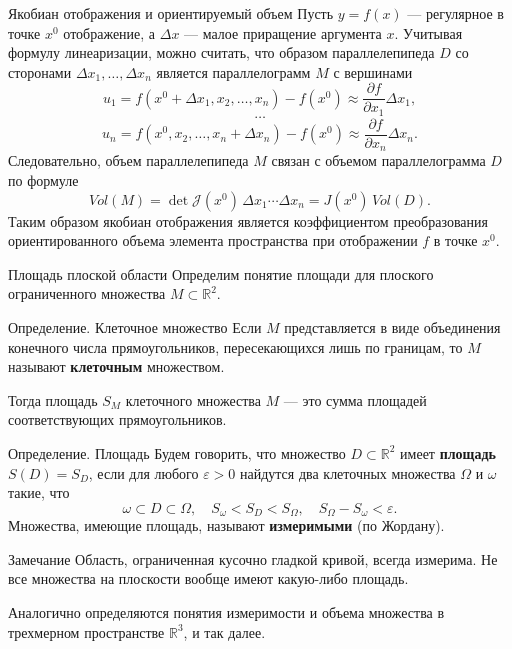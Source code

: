 \documentclass[8pt]{beamer}
\newcommand{\pp}[2]{\frac{\partial #1}{\partial #2}}
\begin{document}
\begin{frame}{Якобиан отображения и ориентируемый объем}
Пусть $y = f(x)$ --- регулярное в точке $x^0$ отображение, а $\Delta x$ --- малое приращение аргумента $x$. Учитывая формулу линеаризации, можно считать, что образом параллелепипеда $D$ со сторонами $\Delta x_1,\ldots,\Delta x_n$ является параллелограмм $M$ с вершинами 
$$u_1=f(x^0+\Delta x_1,x_2,\ldots,x_n)-f(x^0) \approx \pp{f}{x_1}\Delta x_1,$$
$$\ldots$$
$$ u_n = f(x^0,x_2,\ldots,x_n+\Delta x_n)-f(x^0) \approx \pp{f}{x_n}\Delta x_n.$$
Следовательно, объем параллелепипеда $M$ связан с объемом параллелограмма $D$ по формуле
$$Vol(M) = \det\mathcal{J}(x^0)\, \Delta x_1\cdots\Delta x_n = J(x^0)\, Vol(D).$$
Таким образом якобиан отображения является коэффициентом преобразования ориентированного объема элемента пространства при отображении $f$ в точке $x^0$.
\end{frame}

\begin{frame}{Площадь плоской области}
Определим понятие площади для плоского ограниченного множества $M\subset\mathbb{R}^2$.
\begin{block}{Определение. Клеточное множество}
Если $M$ представляется в виде объединения конечного числа прямоугольников, пересекающихся лишь по границам, то $M$ называют {\bf клеточным} множеством. 
\end{block}
Тогда площадь $S_M$ клеточного множества $M$ --- это сумма площадей соответствующих прямоугольников. 
\begin{block}{Определение. Площадь}
Будем говорить, что множество $D\subset\mathbb{R}^2$ имеет {\bf площадь} $S(D) = S_D$, если для любого $\varepsilon>0$ найдутся два клеточных множества $\Omega$ и $\omega$ такие, что 
$$\omega\subset D \subset \Omega,\quad S_\omega<S_D<S_\Omega,\quad S_\Omega-S_\omega<\varepsilon.$$
Множества, имеющие площадь, называют {\bf измеримыми} (по Жордану).
\end{block}
\begin{block}{Замечание}
Область, ограниченная кусочно гладкой кривой, всегда измерима. Не все множества на плоскости вообще имеют какую-либо площадь.
\end{block}
Аналогично определяются понятия измеримости и объема множества в трехмерном пространстве $\mathbb{R}^3$, и так далее.
\end{frame}
\end{document}

